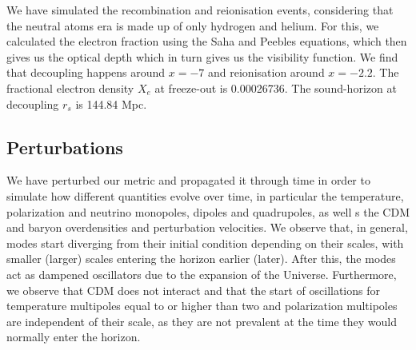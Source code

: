 \documentclass{aa}
\begin{document}
We have simulated the recombination and reionisation events, considering that the neutral atoms era is made up of only hydrogen and helium. For this, we calculated the electron fraction using the Saha and Peebles equations, which then gives us the optical depth which in turn gives us the visibility function. We find that decoupling happens around $x=-7$ and reionisation around $x=-2.2$. The fractional electron density $X_e$ at freeze-out is 0.00026736. The sound-horizon at decoupling $r_s$ is 144.84 Mpc.

\subsection{Perturbations}

We have perturbed our metric and propagated it through time in order to simulate how different quantities evolve over time, in particular the temperature, polarization and neutrino monopoles, dipoles and quadrupoles, as well s the CDM and baryon overdensities and perturbation velocities. We observe that, in general, modes start diverging from their initial condition depending on their scales, with smaller (larger) scales entering the horizon earlier (later). After this, the modes act as dampened oscillators due to the expansion of the Universe. Furthermore, we observe that CDM does not interact and that the start of oscillations for temperature multipoles equal to or higher than two and polarization multipoles are independent of their scale, as they are not prevalent at the time they would normally enter the horizon.



%
%



\end{document}
